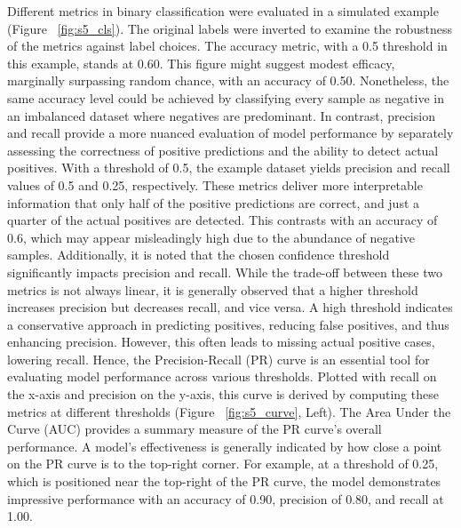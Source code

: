 Different metrics in binary classification were evaluated in a simulated example (Figure ~\ref{fig:s5_cls}). The original labels were inverted to examine the robustness of the metrics against label choices. The accuracy metric, with a 0.5 threshold in this example, stands at 0.60. This figure might suggest modest efficacy, marginally surpassing random chance, with an accuracy of 0.50. Nonetheless, the same accuracy level could be achieved by classifying every sample as negative in an imbalanced dataset where negatives are predominant. In contrast, precision and recall provide a more nuanced evaluation of model performance by separately assessing the correctness of positive predictions and the ability to detect actual positives. With a threshold of 0.5, the example dataset yields precision and recall values of 0.5 and 0.25, respectively. These metrics deliver more interpretable information that only half of the positive predictions are correct, and just a quarter of the actual positives are detected. This contrasts with an accuracy of 0.6, which may appear misleadingly high due to the abundance of negative samples.
Additionally, it is noted that the chosen confidence threshold significantly impacts precision and recall. While the trade-off between these two metrics is not always linear, it is generally observed that a higher threshold increases precision but decreases recall, and vice versa. A high threshold indicates a conservative approach in predicting positives, reducing false positives, and thus enhancing precision. However, this often leads to missing actual positive cases, lowering recall. Hence, the Precision-Recall (PR) curve is an essential tool for evaluating model performance across various thresholds. Plotted with recall on the x-axis and precision on the y-axis, this curve is derived by computing these metrics at different thresholds (Figure ~\ref{fig:s5_curve}, Left). The Area Under the Curve (AUC) provides a summary measure of the PR curve's overall performance. A model's effectiveness is generally indicated by how close a point on the PR curve is to the top-right corner. For example, at a threshold of 0.25, which is positioned near the top-right of the PR curve, the model demonstrates impressive performance with an accuracy of 0.90, precision of 0.80, and recall at 1.00.

